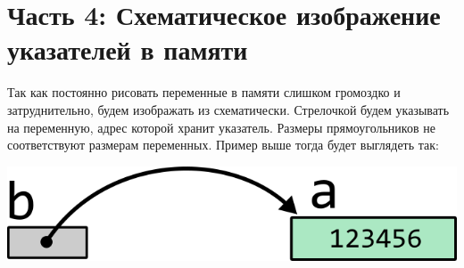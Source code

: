 \documentclass{article}
\begin{document}
\newpage

\section*{Часть 4: Схематическое изображение указателей в памяти}
Так как постоянно рисовать переменные в памяти слишком громоздко и затруднительно, будем изображать из схематически. Стрелочкой будем указывать на переменную, адрес которой хранит указатель. Размеры прямоугольников не соответствуют размерам переменных. Пример выше тогда будет выглядеть так:
\begin{center}
\includegraphics[scale=1]{../images/memory_3_pointer_to_int_b_scheme.png}
\end{center}
\end{document}

